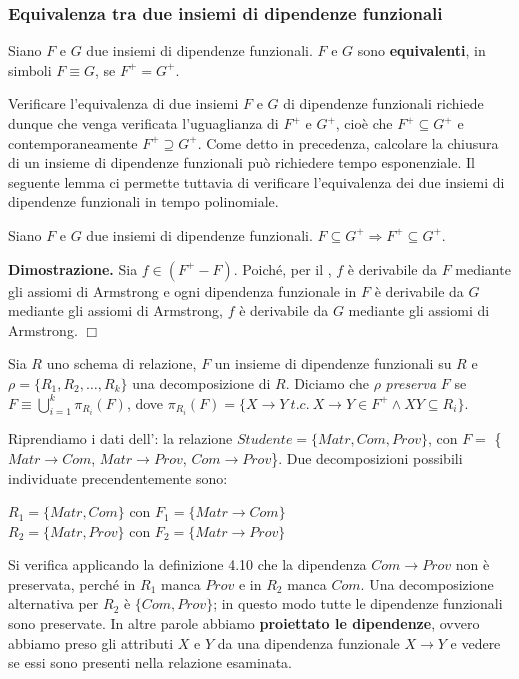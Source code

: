 \subsubsection{Equivalenza tra due insiemi di dipendenze funzionali}
\begin{defn}
Siano $F$ e $G$ due insiemi di dipendenze funzionali. $F$ e $G$ sono \textbf{equivalenti}, in simboli $F \equiv 
G$, se $F^+ = G^+$.
\end{defn}
Verificare l'equivalenza di due insiemi $F$ e $G$ di dipendenze funzionali richiede dunque che venga verificata
l'uguaglianza di $F^+$ e $G^+$, cioè che $F^+ \subseteq G^+$ e contemporaneamente $F^+ \supseteq G^+$. Come 
detto in precedenza, calcolare la chiusura di un insieme di dipendenze funzionali può richiedere tempo 
esponenziale. Il seguente lemma ci permette tuttavia di verificare l'equivalenza dei due insiemi di dipendenze
funzionali in tempo polinomiale.
\label{lemma4_2}
\begin{lem}
Siano $F$ e $G$ due insiemi di dipendenze funzionali. $F \subseteq G^+ \Rightarrow F^+ \subseteq G^+$. 
\end{lem}
\textbf{Dimostrazione.} Sia $f \in (F^+ -F)$. Poiché, per il , $f$ è derivabile
da $F$ mediante gli assiomi di Armstrong e ogni dipendenza funzionale in $F$ è derivabile da $G$ mediante gli 
assiomi di Armstrong, $f$ è derivabile da $G$ mediante gli assiomi di Armstrong. \hfill $\Box$

\begin{defn}
Sia $R$ uno schema di relazione, $F$ un insieme di dipendenze funzionali su $R$ e $\rho = \{R_1, R_2, \ldots,
R_k\}$ una decomposizione di $R$. Diciamo che $\rho$ \emph{preserva} $F$ se $F \equiv \bigcup_{i=1}^k 
\pi_{R_i}(F)$, dove $\pi_{R_i}(F) = \{X \rightarrow Y\ t.c.\ X \rightarrow Y \in F^+ \wedge XY \subseteq R_i\}$.
\end{defn}

\begin{exmp}
 Riprendiamo i dati dell': la relazione $Studente = \{Matr, Com, Prov\}$,
 con $F = $ \{$Matr\rightarrow Com$, $Matr\rightarrow Prov$, $Com\rightarrow Prov$\}. Due decomposizioni possibili
 individuate precendentemente sono:
  \begin{center}
    $R_1 = \{Matr, Com\}$ con $F_1 = \{Matr\rightarrow Com\}$ \\
    $R_2 = \{Matr, Prov\}$ con $F_2 = \{Matr\rightarrow Prov\}$ \\
   \end{center}
 Si verifica applicando la definizione 4.10 che la dipendenza $Com \rightarrow Prov$ non è preservata, 
 perché in $R_1$ manca $Prov$ e in $R_2$ manca $Com$. Una decomposizione alternativa per $R_2$ è
 $\{Com, Prov\}$; in questo modo tutte le dipendenze funzionali sono preservate. In altre parole abbiamo
 \textbf{proiettato le dipendenze}, ovvero abbiamo preso gli attributi $X$ e $Y$ da una dipendenza funzionale
 $X \rightarrow Y$ e vedere se essi sono presenti nella relazione esaminata.
\end{exmp}


